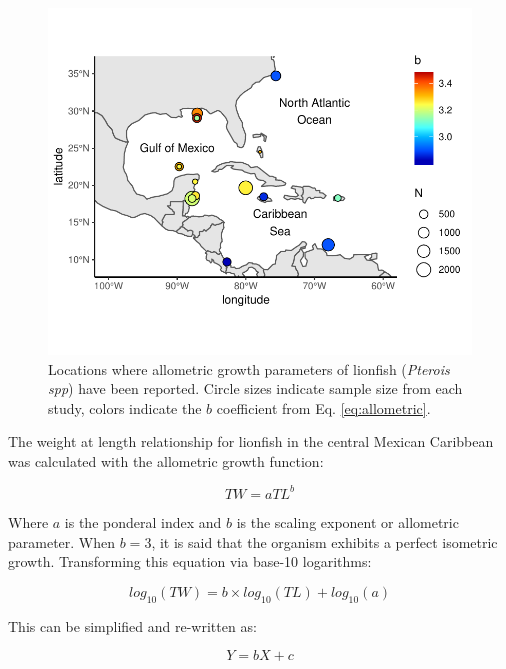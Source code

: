 \documentclass[fleqn,10pt,lineno]{wlpeerj} %
\begin{document}
\begin{figure}
\centering
\includegraphics{Manuscript_files/figure-latex/unnamed-chunk-1-1.pdf}
\caption{\label{fig:map}Locations where allometric growth parameters of
lionfish (\emph{Pterois spp}) have been reported. Circle sizes indicate
sample size from each study, colors indicate the \(b\) coefficient from
Eq. \ref{eq:allometric}.}
\end{figure}

The weight at length relationship for lionfish in the central Mexican
Caribbean was calculated with the allometric growth function:

\begin{equation}
\label{eq:allometric}
TW = aTL^b
\end{equation}

Where \(a\) is the ponderal index and \(b\) is the scaling exponent or
allometric parameter. When \(b = 3\), it is said that the organism
exhibits a perfect isometric growth. Transforming this equation via
base-10 logarithms:

\begin{equation}
\label{eq:log-alo}
log_{10}(TW) = b\times log_{10}(TL) + log_{10}(a)
\end{equation}

This can be simplified and re-written as:

\begin{equation}
\label{eq:log-alo-trans}
Y = bX + c
\end{equation}
\end{document}
